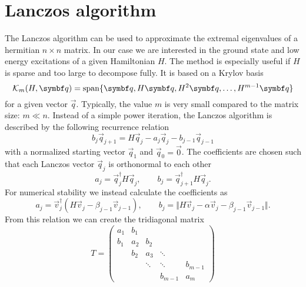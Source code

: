 \section{Lanczos algorithm}

The Lanczos algorithm \cite{Lanczos1950} can be used to approximate the extremal eigenvalues
of a hermitian $n\times n$ matrix.
In our case we are interested in the ground state and low energy excitations of a
given Hamiltonian $H$.
The method is especially useful if $H$ is sparse and too large to decompose fully.
It is based on a Krylov basis
\begin{equation}
    \mathcal{K}_m(H, \vec{q}) = \spn\{\vec{q}, H\vec{q}, H^2\vec{q}, \ldots, H^{m-1}\vec{q}\}
\end{equation}
for a given vector $\vec{q}$.
Typically, the value $m$ is very small compared to the matrix size: $m \ll n$.
Instead of a simple power iteration, the Lanczos algorithm is described by the
following recurrence relation
\begin{equation}
    b_j\vec{q}_{j+1} = H\vec{q}_j - a_j\vec{q}_j - b_{j-1}\vec{q}_{j-1}
    \label{eq:Lanczos-recurrence}
\end{equation}
with a normalized starting vector $\vec{q}_1$ and $\vec{q}_0 = \vec{0}$.
The coefficients are chosen such that each Lanczos vector $\vec{q}_j$ is orthonormal to each other
\begin{equation}
    a_j = \vec{q}_j^\dag H \vec{q}_j,
    \qquad
    b_j = \vec{q}_{j+1}^\dag H \vec{q}_j.
\end{equation}
For numerical stability \cite{Paige1972, Paige1976}
we instead calculate the coefficients as
\begin{equation}
    a_j = \vec{v}_j^\dag(H \vec{v}_j - \beta_{j-1}\vec{v}_{j-1}),
    \qquad
    b_j = \Vert H\vec{v}_j - \alpha\vec{v}_j -  \beta_{j-1}\vec{v}_{j-1} \Vert.
\end{equation}
From this relation we can create the tridiagonal matrix
\begin{equation}
    T
    =
    \begin{pmatrix}
        a_1 & b_1 &        &         &         \\
        b_1 & a_2 & b_2    &         &         \\
            & b_2 & a_3    & \ddots  &         \\
            &     & \ddots & \ddots  & b_{m-1} \\
            &     &        & b_{m-1} & a_m
    \end{pmatrix}
    \label{eq:tridiagonal-scalar}
\end{equation}
